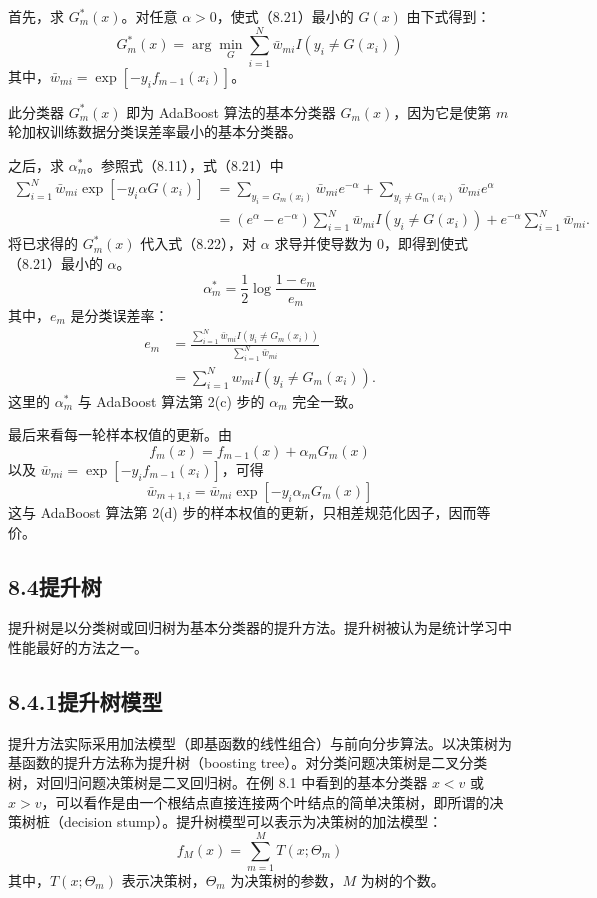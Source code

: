 \documentclass[UTF8, 12pt, fontset=fandol, oneside]{ctexart}
\begin{document}
首先，求 $G_m^\ast(x)$。对任意 $\alpha>0$，使式（8.21）最小的 $G(x)$ 由下式得到：
\[
G_m^\ast(x)=\arg\min_G\sum_{i=1}^N \bar{w}_{mi}I(y_i\ne G(x_i))
\]
其中，$\bar{w}_{mi}=\exp[-y_if_{m-1}(x_i)]$。

此分类器 $G_m^\ast(x)$ 即为 AdaBoost 算法的基本分类器 $G_m(x)$，因为它是使第 $m$ 轮加权训练数据分类误差率最小的基本分类器。

之后，求 $\alpha_m^\ast$。参照式（8.11），式（8.21）中
\begin{equation}
\begin{aligned}
\sum_{i=1}^N\bar{w}_{mi}\exp[-y_i\alpha G(x_i)]
&=\sum_{y_i=G_m(x_i)}\bar{w}_{mi}e^{-\alpha}
+\sum_{y_i\ne G_m(x_i)}\bar{w}_{mi}e^\alpha\\
&=(e^\alpha-e^{-\alpha})\sum_{i=1}^N\bar{w}_{mi}I(y_i\ne G(x_i))
+e^{-\alpha}\sum_{i=1}^N\bar{w}_{mi}.
\end{aligned}
\tag{8.22}
\end{equation}
将已求得的 $G_m^\ast(x)$ 代入式（8.22），对 $\alpha$ 求导并使导数为 0，即得到使式（8.21）最小的 $\alpha$。
\[
\alpha_m^\ast=\frac{1}{2}\log\frac{1-e_m}{e_m}
\]
其中，$e_m$ 是分类误差率：
\begin{equation}
\begin{aligned}
e_m&=\frac{\sum_{i=1}^N\bar{w}_{mi}I(y_i\ne G_m(x_i))}
{\sum_{i=1}^N\bar{w}_{mi}}\\
&=\sum_{i=1}^N w_{mi}I(y_i\ne G_m(x_i)).
\end{aligned}
\tag{8.23}
\end{equation}
这里的 $\alpha_m^\ast$ 与 AdaBoost 算法第 2(c) 步的 $\alpha_m$ 完全一致。

最后来看每一轮样本权值的更新。由
\[
f_m(x)=f_{m-1}(x)+\alpha_mG_m(x)
\]
以及 $\bar{w}_{mi}=\exp[-y_if_{m-1}(x_i)]$，可得
\[
\bar{w}_{m+1,i}=\bar{w}_{mi}\exp[-y_i\alpha_mG_m(x)]
\]
这与 AdaBoost 算法第 2(d) 步的样本权值的更新，只相差规范化因子，因而等价。

\subsection*{8.4\quad 提升树}

提升树是以分类树或回归树为基本分类器的提升方法。提升树被认为是统计学习中性能最好的方法之一。

\subsection*{8.4.1\quad 提升树模型}

提升方法实际采用加法模型（即基函数的线性组合）与前向分步算法。以决策树为基函数的提升方法称为提升树（boosting tree）。对分类问题决策树是二叉分类树，对回归问题决策树是二叉回归树。在例 8.1 中看到的基本分类器 $x<v$ 或 $x>v$，可以看作是由一个根结点直接连接两个叶结点的简单决策树，即所谓的决策树桩（decision stump）。提升树模型可以表示为决策树的加法模型：
\begin{equation}
f_M(x)=\sum_{m=1}^M T(x;\Theta_m)
\tag{8.24}
\end{equation}
其中，$T(x;\Theta_m)$ 表示决策树，$\Theta_m$ 为决策树的参数，$M$ 为树的个数。
\end{document}
